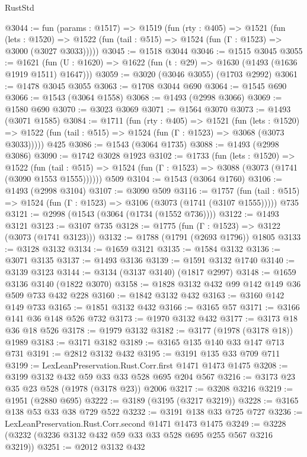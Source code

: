 \begin{lexlean}{RustStd}
\begin{coremodule}
@3044 := fun (params : @1517) =>
  @1519
    (fun (rty : @405) =>
    @1521
      (fun (lets : @1520) =>
      @1522 (fun (tail : @515) => @1524 (fun (Γ : @1523) => @3000 (@3027 @3033)))))
@3045 := @1518 @3044
@3046 := @1515 @3045
@3055 := @1621 (fun (U : @1620) => @1622 (fun (t : @29) => @1630 (@1493 (@1636 @1919 @1511) @1647)))
@3059 := @3020 (@3046 @3055) (@1703 @2992)
@3061 := @1478 @3045 @3055
@3063 := @1708 @3044 @690
@3064 := @1545 @690
@3066 := @1543 (@3064 @1558)
@3068 := @1493 (@2998 @3066)
@3069 := @1580 @690
@3070 := @3023 @3069
@3071 := @1564 @3070
@3073 := @1493 (@3071 @1585)
@3084 := @1711
    (fun (rty : @405) =>
    @1521
      (fun (lets : @1520) =>
      @1522 (fun (tail : @515) => @1524 (fun (Γ : @1523) => @3068 (@3073 @3033)))))
    @425
@3086 := @1543 (@3064 @1735)
@3088 := @1493 (@2998 @3086)
@3090 := @1742 @3028 @1923
@3102 := @1733
    (fun (lets : @1520) =>
    @1522
      (fun (tail : @515) => @1524 (fun (Γ : @1523) => @3088 (@3073 (@1741 (@3090 @1553 @1555))))))
    @509
@3104 := @1543 (@3064 @1760)
@3106 := @1493 (@2998 @3104)
@3107 := @3090 @509
@3116 := @1757
    (fun (tail : @515) => @1524 (fun (Γ : @1523) => @3106 (@3073 (@1741 (@3107 @1555)))))
    @735
@3121 := @2998 (@1543 (@3064 (@1734 (@1552 @736))))
@3122 := @1493 @3121
@3123 := @3107 @735
@3128 := @1775 (fun (Γ : @1523) => @3122 (@3073 (@1741 @3123)))
@3132 := @1788 (@1791 (@2693 @1796)) @1805
@3133 := @3128 @3132
@3134 := @1659 @3121
@3135 := @1584 @3132
@3136 := @3071 @3135
@3137 := @1493 @3136
@3139 := @1591 @3132 @1740
@3140 := @3139 @3123
@3144 := @3134 (@3137 @3140) (@1817 @2997)
@3148 := @1659 @3136 @3140 (@1822 @3070)
@3158 := @1828 @3132 @432 @99 @142 @149 @36 @509 @733 @432 @228
@3160 := @1842 @3132 @432
@3163 := @3160 @142 @149 @733
@3165 := @1851 @3132 @432
@3166 := @3165 @57
@3171 := @3166 @141 @36 @148 @526 @732
@3173 := @1970 @3132 @432
@3177 := @3173 @18 @36 @18 @526
@3178 := @1979 @3132
@3182 := @3177 (@1978 (@3178 @18)) @1989
@3183 := @3171 @3182
@3189 := @3165 @135 @140 @33 @147 @713 @731
@3191 := @2812 @3132 @432
@3195 := @3191 @135 @33 @709 @711
@3199 := LexLeanPreservation.Rust.Corr.first @1471 @1473 @1475
@3208 := @3199 @3132 @432 @59 @33 @33 @528 @695 @204 @567
@3216 := @3173 @23 @35 @23 @528 (@1978 (@3178 @23)) @2006
@3217 := @3208 @3216
@3219 := @1951 (@2880 @695)
@3222 := @3189 (@3195 (@3217 @3219))
@3228 := @3165 @138 @53 @33 @38 @729 @522
@3232 := @3191 @138 @33 @725 @727
@3236 := LexLeanPreservation.Rust.Corr.second @1471 @1473 @1475
@3249 := @3228 (@3232 (@3236 @3132 @432 @59 @33 @33 @528 @695 @255 @567 @3216 @3219))
@3251 := @2012 @3132 @432

\end{coremodule}
\end{lexlean}
